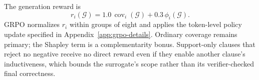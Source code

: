 The generation reward is
\begin{equation}\label{eq:generation-reward}
 r_i(\mathcal G)=1.0\,\operatorname{cov}_i(\mathcal G)
 +0.3\,\phi_i(\mathcal G).
\end{equation}
GRPO normalizes \(r_i\) within groups of eight and applies the token-level
policy update specified in Appendix~\ref{app:grpo-details}.  Ordinary
coverage remains primary; the Shapley term is a complementarity bonus.
Support-only clauses that reject no negative receive no direct reward even if
they enable another clause's inductiveness, which bounds the surrogate's
scope rather than its verifier-checked final correctness.

